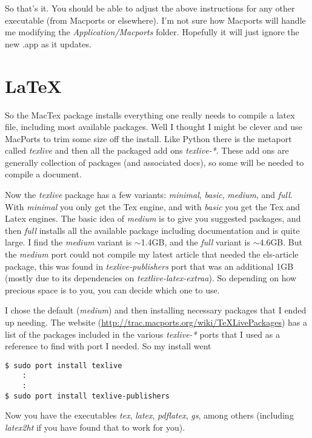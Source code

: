 \documentclass[11pt]{article}
\begin{document}
So that's it. You should be able to adjust the above instructions for any other executable (from Macports or elsewhere). I'm not sure how Macports will handle me modifying the {\it Application/Macports} folder. Hopefully it will just ignore the new .app as it updates.


%




%
%
\section{\LaTeX}
So the MacTex package installs everything one really needs to compile a latex file, including most available packages. Well I thought I might be clever and use MacPorts to trim some size off the install. Like Python there is the metaport called \textit{texlive} and then all the packaged add ons \textit{texlive-*}. These add ons are generally collection of packages (and associated docs), so some will be needed to compile a document. 

Now the \textit{texlive} package has a few variants: \textit{minimal}, \textit{basic}, \textit{medium}, and \textit{full}. With \textit{minimal} you only get the Tex engine, and with \textit{basic} you get the Tex and Latex engines. The basic idea of \textit{medium} is to give you suggested packages, and then \textit{full} installs all the available package including documentation and is quite large. I find the \textit{medium} variant is $\sim$1.4GB, and the \textit{full} variant is $\sim$4.6GB. But the \textit{medium} port could not compile my latest article that needed the els-article package, this was found in \textit{texlive-publishers} port that was an additional 1GB (mostly due to its dependencies on \textit{textlive-latex-extraa}). So depending on how precious space is to you, you can decide which one to use. 

I chose the default (\textit{medium}) and then installing necessary packages that I ended up needing. The website (\url{http://trac.macports.org/wiki/TeXLivePackages}) has a list of the packages included in the various \textit{texlive-*} ports that I used as a reference to find with port I needed. So my install went
\begin{lstlisting}[style=Bash]
$ sudo port install texlive
	:
	:
$ sudo port install texlive-publishers
\end{lstlisting}
Now you have the executables \textit{tex}, \textit{latex}, \textit{pdflatex}, \textit{gs}, among others (including \textit{latex2ht} if you have found that to work for you). 
\end{document}
